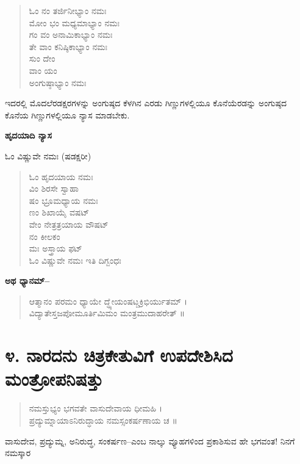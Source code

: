 \begin{verse}
ಓಂ ನಂ ತರ್ಜಿನೀಭ್ಯಾಂ ನಮಃ\\ಮೋಂ ಭಂ ಮಧ್ಯಮಾಭ್ಯಾಂ ನಮಃ\\ಗಂ ವಂ ಅನಾಮಿಕಾಭ್ಯಾಂ ನಮಃ\\ತೇ ವಾಂ ಕನಿಷ್ಠಿಕಾಭ್ಯಾಂ ನಮಃ\\ಸುಂ ದೇಂ\\ವಾಂ ಯಂ \\ಅಂಗುಷ್ಠಾಭ್ಯಾಂ ನಮಃ
\end{verse}

ಇದರಲ್ಲಿ ಮೊದಲೆರಡಕ್ಷರಗಳನ್ನು ಅಂಗುಷ್ಠದ ಕೆಳಗಿನ ಎರಡು ಗಿಣ್ಣುಗಳಲ್ಲಿಯೂ ಕೊನೆಯೆರಡನ್ನು ಅಂಗುಷ್ಠದ ಕೊನೆಯ ಗಿಣ್ಣುಗಳಲ್ಲಿಯೂ ನ್ಯಾಸ ಮಾಡಬೇಕು.

\begin{center}
\textbf{ಹೃದಯಾದಿ ನ್ಯಾಸ}
\end{center}

\begin{center}
ಓಂ ವಿಷ್ಣುವೇ ನಮಃ (ಷಡಕ್ಷರೀ)
\end{center}

\begin{verse}
ಓಂ ಹೃದಯಾಯ ನಮಃ\\ವಿಂ ಶಿರಸೇ ಸ್ವಾಹಾ\\ಷಂ ಭ್ರೂಮಧ್ಯಾಯ ನಮಃ\\ಣಂ ಶಿಖಾಯೈ ವಷಟ್​\\ವೇಂ ನೇತ್ರತ್ರಯಾಯ ವೌಷಟ್​\\ನಂ ಕೀಲಕಂ\\ಮಃ ಅಸ್ತ್ರಾಯ ಫಟ್​\\ಓಂ ವಿಷ್ಣುವೇ ನಮಃ ಇತಿ ದಿಗ್ಬಂಧಃ
\end{verse}

\textbf{ಅಥ ಧ್ಯಾನಮ್​–}

\begin{verse}
ಆತ್ಮಾನಂ ಪರಮಂ ಧ್ಯಾಯೇ ದ್ಧ್ಯೇಯಂಷಟ್ಚಕ್ರಿಭಿರ್ಯುತಮ್​ ।\\ವಿದ್ಯಾತೇಸ್ತಜಪೋಮೂರ್ತಿಮಿಮಂ ಮಂತ್ರಮುದಾಹರೇತ್ ॥
\end{verse}


\section{೪. ನಾರದನು ಚಿತ್ರಕೇತುವಿಗೆ ಉಪದೇಶಿಸಿದ ಮಂತ್ರೋಪನಿಷತ್ತು}

\begin{verse}
ನಮಸ್ತುಭ್ಯಂ ಭಗವತೇ ವಾಸುದೇವಾಯ ಧೀಮಹಿ ।\\ಪ್ರದ್ಯುಮ್ನಾಯಾಽನಿರುದ್ಧಾಯ ನಮಸ್ಸಂಕರ್ಷಣಾಯ ಚ ॥
\end{verse}

ವಾಸುದೇವ, ಪ್ರದ್ಯುಮ್ನ, ಅನಿರುದ್ಧ, ಸಂಕರ್ಷಣ–ಎಂಬ ನಾಲ್ಕು ವ್ಯೂಹಗಳಿಂದ ಪ್ರಕಾಶಿಸುವ ಹೇ ಭಗವಂತ! ನಿನಗೆ ನಮಸ್ಕಾರ

